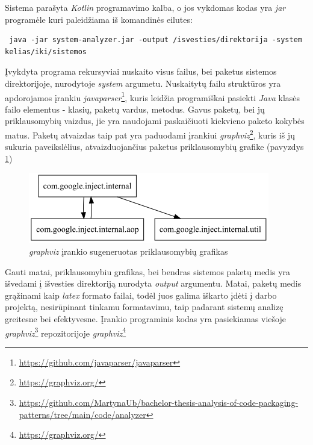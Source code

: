 Sistema parašyta \textit{Kotlin} programavimo kalba, o jos vykdomas kodas yra \textit{jar} programėle kuri paleidžiama iš komandinės eilutes:
\begin{lstlisting}
 java -jar system-analyzer.jar -output /isvesties/direktorija -system  kelias/iki/sistemos
\end{lstlisting}
Įvykdyta programa rekursyviai nuskaito visus failus, bei paketus sistemos direktorijoje, nurodytoje \textit{system} argumetu.
Nuskaitytų failu struktūros yra apdorojamos įrankiu \textit{javaparser}\footnote{\url{https://github.com/javaparser/javaparser}}, kuris leidžia
programiškai pasiekti \textit{Java} klasės failo elementus - klasių, paketų vardus, metodus.
Gavus paketų, bei jų priklausomybių vaizdus, jie yra naudojami paskaičiuoti kiekvieno paketo kokybės matus.
Paketų atvaizdas taip pat yra paduodami įrankiui \textit{graphviz}\footnote{\url{https://graphviz.org/}}, kuris iš jų sukuria paveikslėlius, atvaizduojančius paketus
priklausomybių grafike (pavyzdys \ref{img:graphviz})
\begin{figure}[H]
    \centering
    \includegraphics[scale=0.6]{img/packages_example}
    \caption{\textit{graphviz} įrankio sugeneruotas priklausomybių grafikas}
    \label{img:graphviz}
\end{figure}
Gauti matai, priklausomybiu grafikas, bei bendras sistemos paketų medis yra išvedami į išvesties direktoriją nurodyta \textit{output} argumentu.
Matai, paketų medis grąžinami kaip \textit{latex} formato failai, todėl juos galima iškarto įdėti į darbo projektą, nesirūpinant tinkamu formatavimu,
taip padarant sistemų analizę greitesne bei efektyvesne.
Įrankio programinis kodas yra pasiekiamas viešoje \textit{graphviz}\footnote{\url{https://github.com/MartynaUb/bachelor-thesis-analysis-of-code-packaging-patterns/tree/main/code/analyzer}} repozitorijoje \textit{graphviz}\footnote{\url{https://graphviz.org/}}

